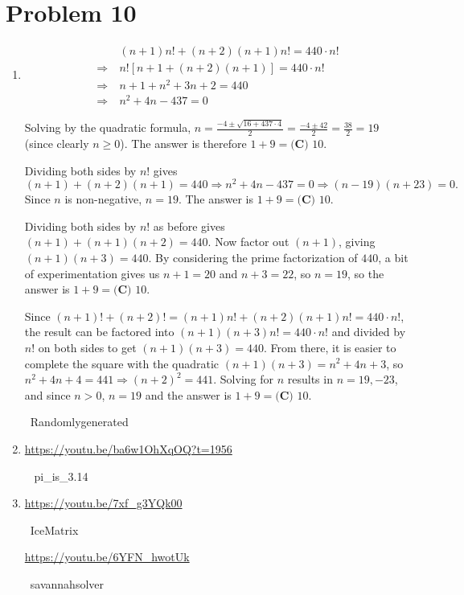 \documentclass{article}%
\begin{document}
\section*{Problem 10}%
\label{sec:Problem10}%
\begin{enumerate}%
\item%
\[\begin{split}& (n+1)n! + (n+2)(n+1)n! = 440 \cdot n! \\ \Rightarrow \ &n![n+1 + (n+2)(n+1)] = 440 \cdot n! \\ \Rightarrow \ &n + 1 + n^2 + 3n + 2 = 440 \\ \Rightarrow \ &n^2 + 4n - 437 = 0\end{split}\]

Solving by the quadratic formula, $n = \frac{-4\pm \sqrt{16+437\cdot4}}{2} = \frac{-4\pm 42}{2} = \frac{38}{2} = 19$ (since clearly $n \geq 0$). The answer is therefore $1 + 9 = \boxed{\textbf{(C) }10}$.

Dividing both sides by $n!$ gives
\[(n+1)+(n+2)(n+1)=440 \Rightarrow n^2+4n-437=0 \Rightarrow (n-19)(n+23)=0.\]
Since $n$ is non-negative, $n=19$. The answer is $1 + 9 = \boxed{\textbf{(C) }10}$.

Dividing both sides by $n!$ as before gives $(n+1)+(n+1)(n+2)=440$. Now factor out $(n+1)$, giving $(n+1)(n+3)=440$. By considering the prime factorization of $440$, a bit of experimentation gives us $n+1=20$ and $n+3=22$, so $n=19$, so the answer is $1 + 9 = \boxed{\textbf{(C) }10}$.

Since $(n+1)! + (n+2)! = (n+1)n! + (n+2)(n+1)n! = 440 \cdot n!$, the result can be factored into $(n+1)(n+3)n!=440 \cdot n!$ and divided by $n!$ on both sides to get $(n+1)(n+3)=440$. From there, it is easier to complete the square with the quadratic $(n+1)(n+3) = n^2 + 4n + 3$, so $n^2+4n+4=441 \Rightarrow (n+2)^2=441$. Solving for $n$ results in $n=19,-23$, and since $n>0$, $n=19$ and the answer is $1 + 9 = \boxed{\textbf{(C) }10}$.

~Randomlygenerated

%
\item%
\href{https://youtu.be/ba6w1OhXqOQ?t=1956}{https://youtu.be/ba6w1OhXqOQ?t=1956}

~ pi\_is\_3.14

%
\item%
\href{https://youtu.be/7xf_g3YQk00}{https://youtu.be/7xf\_g3YQk00}

~IceMatrix

\href{https://youtu.be/6YFN_hwotUk}{https://youtu.be/6YFN\_hwotUk}

~savannahsolver

%
\end{enumerate}
\end{document}
